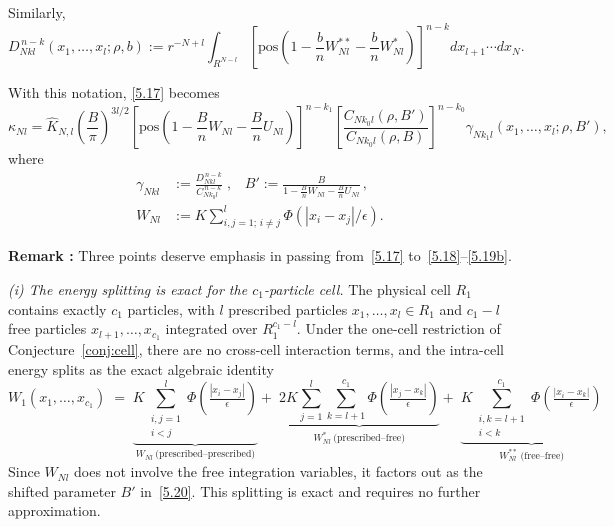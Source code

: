\documentclass[11pt]{article}
\begin{document}
Similarly,
\begin{equation}
D^{\,n-k}_{Nkl}(x_1,\dots,x_l;\rho,b)
:=
r^{-N+l}
\int_{R^{N-l}}
\left[
\mathrm{pos}
\left(
1-\frac{b}{n}W_{Nl}^{**}-\frac{b}{n}W_{Nl}^{*}
\right)
\right]^{n-k}
dx_{l+1}\cdots dx_N.
\tag{5.19b}\label{5.19b}
\end{equation}

With this notation, \eqref{5.17} becomes
\begin{equation}
\kappa_{Nl}
=
\hat K_{N,l}
\left(\frac{B}{\pi}\right)^{3l/2}
\left[
\mathrm{pos}
\left(
1-\frac{B}{n}W_{Nl}-\frac{B}{n}U_{Nl}
\right)
\right]^{n-k_1}
\left[
\frac{C_{Nk_0l}(\rho,B')}
     {C_{Nk_0l}(\rho,B)}
\right]^{n-k_0}
\gamma_{Nk_1l}(x_1,\dots,x_l;\rho,B'),
\tag{5.20}\label{5.20}
\end{equation}
where
\begin{align*}
\gamma_{Nkl}
&:=
\frac{D^{\,n-k}_{Nkl}}{C^{\,n-k}_{Nk_0l}}\;,\;\;\;
B':=
\frac{B}{1-\frac{B}{n}W_{Nl}-\frac{B}{n}U_{Nl}}\,,\\
W_{Nl}
&:=
K\sum_{i,j=1;\,i\neq j}^l\Phi(|x_i-x_j|/\epsilon).
\end{align*}

\textbf{Remark :}
Three points deserve emphasis in passing 
from~\eqref{5.17} to~\eqref{5.18}--\eqref{5.19b}.

\noindent\textit{(i) The energy splitting is exact for the
$c_1$-particle cell.}
The physical cell $R_1$ contains exactly $c_1$ particles,
with $l$ prescribed particles $x_1,\ldots,x_l \in R_1$
and $c_1 - l$ free particles $x_{l+1},\ldots,x_{c_1}$
integrated over $R_1^{c_1-l}$.
Under the one-cell restriction of
Conjecture~\ref{conj:cell}, there are no cross-cell
interaction terms, and the intra-cell energy splits as
the exact algebraic identity
\begin{equation*}
  W_1(x_1,\ldots,x_{c_1})
  \;=\;
  \underbrace{K\!\!\sum_{\substack{i,j=1\\i<j}}^{l}
    \Phi\!\left(\tfrac{|x_i-x_j|}{\epsilon}\right)}_{
    W_{Nl}\ \text{(prescribed--prescribed)}}
  +\;
  \underbrace{2K\sum_{j=1}^{l}\sum_{k=l+1}^{c_1}
    \Phi\!\left(\tfrac{|x_j-x_k|}{\epsilon}\right)}_{
    W^{*}_{Nl}\ \text{(prescribed--free)}}
  +\;
  \underbrace{K\!\!\sum_{\substack{i,k=l+1\\i<k}}^{c_1}
    \Phi\!\left(\tfrac{|x_i-x_k|}{\epsilon}\right)}_{
    W^{**}_{Nl}\ \text{(free--free)}}
\end{equation*}
Since $W_{Nl}$ does not involve the free integration
variables, it factors out as the shifted parameter
$B'$ in~\eqref{5.20}.
This splitting is exact and requires no further
approximation.
\end{document}
